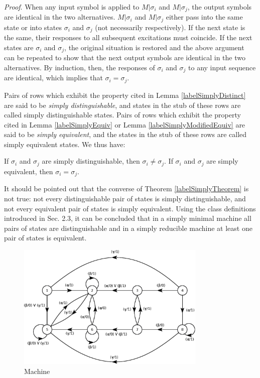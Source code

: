 \documentclass[a4paper]{report}
\begin{document}
    \emph{Proof}. When any input symbol is applied to $M|\sigma_i$ and $M|\sigma_j$, the output symbols are identical in the two alternatives. $M|\sigma_i$ and $M|\sigma_j$ either pass into the same state or into states $\sigma_i$ and $\sigma_j$ (not necessarily respectively). If the next state is the same, their responses to all subsequent excitations must coincide. If the next states are $\sigma_i$ and $\sigma_j$, the original situation is restored and the above argument can be repeated to show that the next output symbols are identical in the two alternatives. By induction, then, the responses of $\sigma_i$ and $\sigma_j$ to any input sequence are identical, which implies that $\sigma_i = \sigma_j$.

    Pairs of rows which exhibit the property cited in Lemma \ref{labelSimplyDistinct} are said to be \emph{simply distinguishable}, and states in the stub of these rows are called simply distinguishable states. Pairs of rows which exhibit the property cited in Lemma \ref{labelSimplyEquiv} or Lemma \ref{labelSimplyModifiedEquiv} are said to be \emph{simply equivalent}, and the states in the stub of these rows are called simply equivalent states.
    We thus have:

    \theorem \label{labelSimplyTheorem} If $\sigma_i$ and $\sigma_j$ are simply distinguishable, then $\sigma_i \neq \sigma_j $. If $\sigma_i$ and $\sigma_j$ are simply equivalent, then $\sigma_i = \sigma_j $.

    It should be pointed out that the converse of Theorem \ref{labelSimplyTheorem} is not true: not every distinguishable pair of states is simply distinguishable, and not every equivalent pair of states is simply equivalent. Using the class definitions introduced in Sec. 2.3, it can be concluded that in a simply minimal machine all pairs of states are distinguishable and in a simply reducible machine at least one pair of states is equivalent.

    \incSampleMachine
    \begin{figure}[!t]
        \centering
        \includegraphics[width=256pt,clip]{images/eps/machineA6}
        \caption{Machine \sampleMachine}
        \label{fig:machineA6}
    \end{figure}
\end{document}
